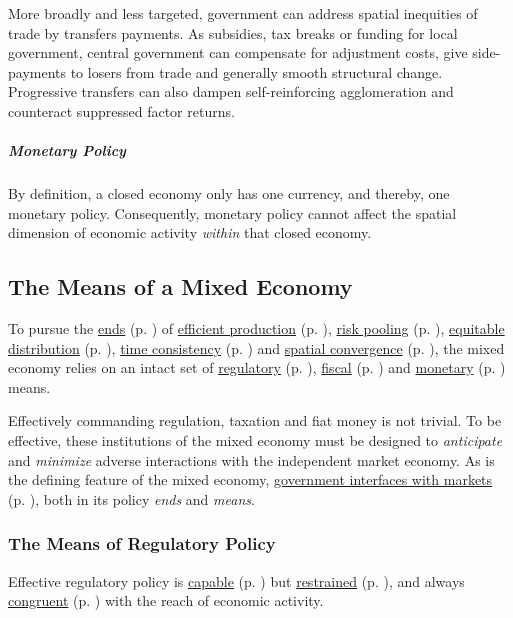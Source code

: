 More broadly and less targeted, government can address spatial inequities of trade by transfers payments. As subsidies, tax breaks or funding for local government, central government can compensate for adjustment costs, give side-payments to losers from trade and generally smooth structural change. Progressive transfers can also dampen self-reinforcing agglomeration and counteract suppressed factor returns.

\subparagraph{Monetary Policy}
By definition, a closed economy only has one currency, and thereby, one monetary policy. Consequently, monetary policy cannot affect the spatial dimension of economic activity \emph{within} that closed economy. 

\subsection[Means]{The Means of a Mixed Economy} \label{sec:means}
To pursue the \hyperref[sec:ends]{ends} (p. \pageref{sec:ends}) of \hyperref[sec:production]{efficient production} (p. \pageref{sec:production}), \hyperref[sec:risk]{risk pooling} (p. \pageref{sec:risk}), \hyperref[sec:distribution]{equitable distribution} (p. \pageref{sec:distribution}), \hyperref[sec:time]{time consistency} (p. \pageref{sec:time}) and \hyperref[sec:space]{spatial convergence} (p. \pageref{sec:space}), the mixed economy relies on an intact set of \hyperref[sec:regulatory]{regulatory} (p. \pageref{sec:regulatory}), \hyperref[sec:fiscal]{fiscal} (p. \pageref{sec:fiscal}) and \hyperref[sec:monetary]{monetary} (p. \pageref{sec:monetary}) means. 

Effectively commanding regulation, taxation and fiat money is not trivial. To be effective, these institutions of the mixed economy must be designed to \emph{anticipate} and \emph{minimize} adverse interactions with the independent market economy. As is the defining feature of the mixed economy, \hyperref[sec:interface]{government interfaces with markets} (p. \pageref{sec:interface}), both in its policy \emph{ends} and \emph{means}.

\subsubsection[Regulatory Policy]{The Means of Regulatory Policy} \label{sec:regulatory} 

Effective regulatory policy is \hyperref[it:capability]{capable} (p. \pageref{it:capability}) but \hyperref[it:restraint]{restrained} (p. \pageref{it:restraint}), and always \hyperref[it:congruence]{congruent} (p. \pageref{it:congruence}) with the reach of economic activity.

